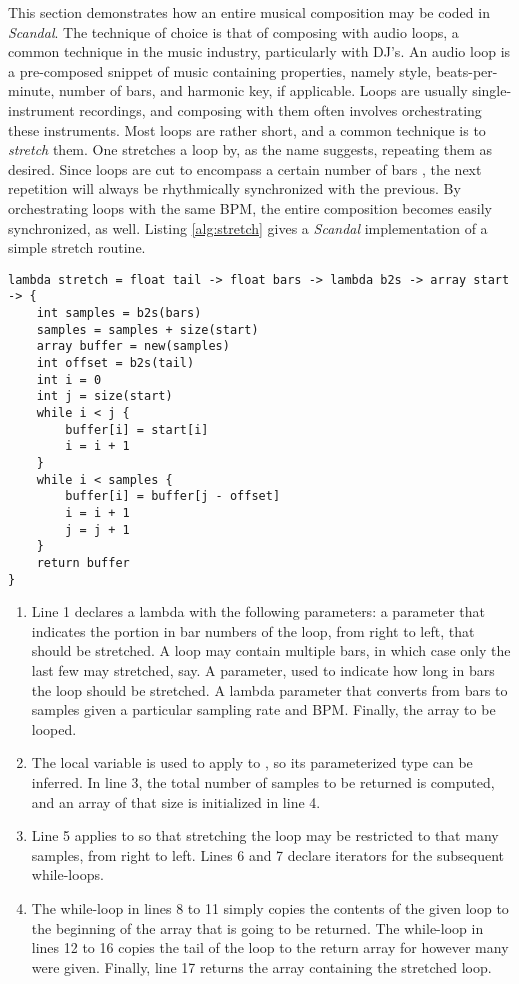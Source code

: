 This section demonstrates how an entire musical composition may be coded in \emph{Scandal}. The technique of choice is that of composing with audio loops, a common technique in the music industry, particularly with DJ's. An audio loop is a pre-composed snippet of music containing properties, namely style, beats-per-minute, number of bars, and harmonic key, if applicable. Loops are usually single-instrument recordings, and composing with them often involves orchestrating these instruments. Most loops are rather short, and a common technique is to \emph{stretch} them. One stretches a loop by, as the name suggests, repeating them as desired. Since loops are cut to encompass a certain number of bars , the next repetition will always be rhythmically synchronized with the previous. By orchestrating loops with the same BPM, the entire composition becomes easily synchronized, as well. Listing \ref{alg:stretch} gives a \emph{Scandal} implementation of a simple stretch routine.

\begin{lstlisting}[emph={lambda,float,array,int,size,new,while,return},emphstyle={\textbf},caption={Stretching a loop in \emph{Scandal}.},label={alg:stretch}]
lambda stretch = float tail -> float bars -> lambda b2s -> array start -> {
	int samples = b2s(bars)
	samples = samples + size(start)
	array buffer = new(samples)
	int offset = b2s(tail)
	int i = 0
	int j = size(start)
	while i < j {
		buffer[i] = start[i]
		i = i + 1
	}
	while i < samples {
		buffer[i] = buffer[j - offset]
		i = i + 1
		j = j + 1
	}
	return buffer
}
\end{lstlisting}

\begin{enumerate}
	\item Line 1 declares a  lambda with the following parameters: a  parameter that indicates the portion in bar numbers of the loop, from right to left, that should be stretched. A loop may contain multiple bars, in which case only the last few may stretched, say. A  parameter, used to indicate how long in bars the loop should be stretched. A lambda parameter that converts from bars to samples given a particular sampling rate and BPM. Finally, the array to be looped.
	\item The local variable  is used to apply  to , so its parameterized type can be inferred. In line 3, the total number of samples to be returned is computed, and an array of that size is initialized in line 4.
	\addtocounter{enumi}{2}
	\item Line 5 applies  to  so that stretching the loop may be restricted to that many samples, from right to left. Lines 6 and 7 declare iterators for the subsequent while-loops.
	\addtocounter{enumi}{2}
	\item The while-loop in lines 8 to 11 simply copies the contents of the given loop to the beginning of the array that is going to be returned. The while-loop in lines 12 to 16 copies the tail of the loop to the return array for however many  were given. Finally, line 17 returns the array containing the stretched loop.
\end{enumerate}

